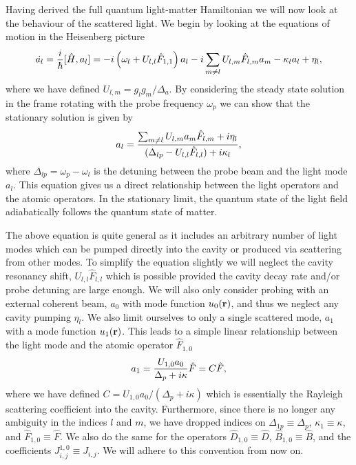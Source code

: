 Having derived the full quantum light-matter Hamiltonian we will now
look at the behaviour of the scattered light. We begin by looking at
the equations of motion in the Heisenberg picture
\begin{equation}
  \dot{a_l} = \frac{i}{\hbar} [\hat{H}, a_l] = 
  -i \left(\omega_l + U_{l,l}\hat{F}_{1,1} \right) a_l
   - i \sum_{m \ne l} U_{l,m} \hat{F}_{l,m} a_m
    - \kappa_l a_l + \eta_l,
\end{equation}
where we have defined $U_{l,m} = g_l g_m / \Delta_a$. By considering
the steady state solution in the frame rotating with the probe
frequency $\omega_p$ we can show that the stationary solution is given
by
\begin{equation}
  a_l = \frac{\sum_{m \ne l} U_{l,m} a_m \hat{F}_{l,m} + i \eta_l} 
  {(\Delta_{lp} - U_{l,l} \hat{F}_{l,l}) + i \kappa_l},
\end{equation}
where $\Delta_{lp} = \omega_p - \omega_l$ is the detuning between the
probe beam and the light mode $a_l$. This equation gives us a direct
relationship between the light operators and the atomic operators. In
the stationary limit, the quantum state of the light field
adiabatically follows the quantum state of matter.

The above equation is quite general as it includes an arbitrary number
of light modes which can be pumped directly into the cavity or
produced via scattering from other modes. To simplify the equation
slightly we will neglect the cavity resonancy shift,
$U_{l,l} \hat{F}_{l,l}$ which is possible provided the cavity decay
rate and/or probe detuning are large enough. We will also only
consider probing with an external coherent beam, $a_0$ with mode
function $u_0(\mathbf{r})$, and thus we neglect any cavity pumping
$\eta_l$. We also limit ourselves to only a single scattered mode,
$a_1$ with a mode function $u_1(\mathbf{r})$. This leads to a simple linear
relationship between the light mode and the atomic operator
$\hat{F}_{1,0}$
\begin{equation}
  \label{eq:a}
  a_1 = \frac{U_{1,0} a_0} {\Delta_{p} + i \kappa} \hat{F} =
  C \hat{F},
\end{equation}
where we have defined $C = U_{1,0} a_0 / (\Delta_{p} + i \kappa)$
which is essentially the Rayleigh scattering coefficient into the
cavity. Furthermore, since there is no longer any ambiguity in the
indices $l$ and $m$, we have dropped indices on
$\Delta_{1p} \equiv \Delta_p$, $\kappa_1 \equiv \kappa$, and
$\hat{F}_{1,0} \equiv \hat{F}$. We also do the same for the operators
$\hat{D}_{1,0} \equiv \hat{D}$, $\hat{B}_{1,0} \equiv \hat{B}$, and
the coefficients $J^{1,0}_{i,j} \equiv J_{i,j}$. We will adhere to
this convention from now on.

